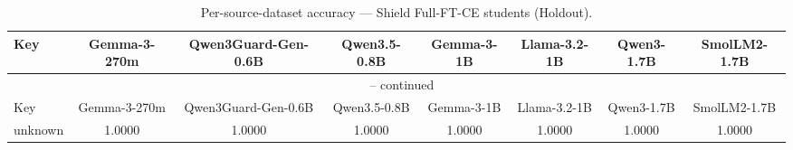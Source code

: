 \begin{landscape}
\begin{longtable}{lccccccc}
\caption{Per-source-dataset accuracy — Shield Full-FT-CE students (Holdout).} \\
\label{tab:students_full_ft_ce_per_dataset_holdout}
\toprule
Key & Gemma-3-270m & Qwen3Guard-Gen-0.6B & Qwen3.5-0.8B & Gemma-3-1B & Llama-3.2-1B & Qwen3-1.7B & SmolLM2-1.7B \\
\midrule
\endfirsthead
\multicolumn{8}{c}{\tablename\ \thetable{} -- continued} \\
\toprule
Key & Gemma-3-270m & Qwen3Guard-Gen-0.6B & Qwen3.5-0.8B & Gemma-3-1B & Llama-3.2-1B & Qwen3-1.7B & SmolLM2-1.7B \\
\midrule
\endhead
unknown & 1.0000 & 1.0000 & 1.0000 & 1.0000 & 1.0000 & 1.0000 & 1.0000 \\
\bottomrule
\end{longtable}
\end{landscape}